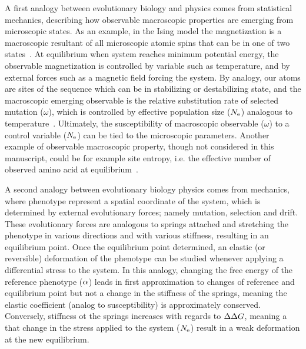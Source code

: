 A first analogy between evolutionary biology and physics comes from statistical mechanics, describing how observable macroscopic properties are emerging from microscopic states.
As an example, in the Ising model the magnetization is a macroscopic resultant of all microscopic atomic spins that can be in one of two states~\citep{Brush1967}.
At equilibrium when system reaches minimum potential energy, the observable magnetization is controlled by variable such as temperature, and by external forces such as a magnetic field forcing the system.
By analogy, our atoms are sites of the sequence which can be in stabilizing or destabilizing state, and the macroscopic emerging observable is the relative substitution rate of selected mutation ($\omega$), which is controlled by effective population size ($N_{\mathrm{e}}$) analogous to temperature~\citep{Sella2005}.
Ultimately, the susceptibility of macroscopic observable ($\omega$) to a control variable ($N_{\mathrm{e}}$) can be tied to the microscopic parameters.
Another example of observable macroscopic property, though not considered in this manuscript, could be for example site entropy, i.e. the effective number of observed amino acid at equilibrium~\citep{Goldstein2016, Jimenez2018, Jiang2018}.

A second analogy between evolutionary biology physics comes from mechanics, where phenotype represent a spatial coordinate of the system, which is determined by external evolutionary forces; namely mutation, selection and drift.
These evolutionary forces are analogous to springs attached and stretching the phenotype in various directions and with various stiffness, resulting in an equilibrium point.
Once the equilibrium point determined, an elastic (or reversible) deformation of the phenotype can be studied whenever applying a differential stress to the system.
In this analogy, changing the free energy of the reference phenotype ($\alpha$) leads in first approximation to changes of reference and equilibrium point but not a change in the stiffness of the springs, meaning the elastic coefficient (analog to susceptibility) is approximately conserved.
Conversely, stiffness ot the springs increases with regards to $\Delta \Delta G$, meaning a that change in the stress applied to the system ($N_{\mathrm{e}}$) result in a weak deformation at the new equilibrium.


